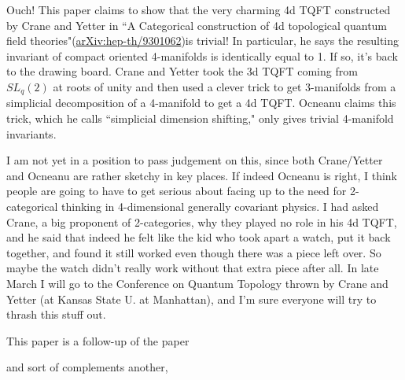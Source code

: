 
Ouch! This paper claims to show that the very charming 4d TQFT constructed by Crane and Yetter in ``A Categorical construction of 4d topological quantum field theories"(\href{https://arxiv.org/abs/hep-th/9301062}{arXiv:hep-th/9301062})is trivial! In particular, he says the resulting invariant of compact oriented 4-manifolds is identically equal to 1. If so, it's back to the drawing board. Crane and Yetter took the 3d TQFT coming from $SL_q(2)$ at roots of unity and then used a clever trick to get 3-manifolds from a simplicial decomposition of a 4-manifold to get a 4d TQFT. Ocneanu claims this trick, which he calls ``simplicial dimension shifting," only gives trivial 4-manifold invariants.

I am not yet in a position to pass judgement on this, since both Crane/Yetter and Ocneanu are rather sketchy in key places. If indeed Ocneanu is right, I think people are going to have to get serious about facing up to the need for 2-categorical thinking in 4-dimensional generally covariant physics. I had asked Crane, a big proponent of 2-categories, why they played no role in his 4d TQFT, and he said that indeed he felt like the kid who took apart a watch, put it back together, and found it still worked even though there was a piece left over. So maybe the watch didn't really work without that extra piece after all. In late March I will go to the Conference on Quantum Topology thrown by Crane and Yetter (at Kansas State U. at Manhattan), and I'm sure everyone will try to thrash this stuff out.


This paper is a follow-up of the paper


and sort of complements another,


